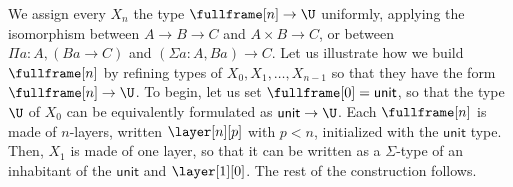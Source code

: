 \documentclass[10pt]{art.cls/art}
\newcommand{\unittype}{\ensuremath{\mathsf{unit}}}
\begin{document}
We assign every $X_n$ the type $\fullframe[n] \rightarrow \U$ uniformly, applying the isomorphism between $A \rightarrow B \rightarrow C$ and $A \times B \rightarrow C$, or between $\Pi a : A, (B a \rightarrow C)$ and $(\Sigma a : A, B a) \rightarrow C$. Let us illustrate how we build $\fullframe[n]$ by refining types of $X_0, X_1, \ldots, X_{n - 1}$ so that they have the form $\fullframe[n] \rightarrow \U$. To begin, let us set $\fullframe[0] = \unittype$, so that the type $\U$ of $X_0$ can be equivalently formulated as $\unittype \rightarrow \U$. Each $\fullframe[n]$ is made of $n$-layers, written $\layer[n][p]$ with $p < n$, initialized with the $\unittype$ type. Then, $X_1$ is made of one layer, so that it can be written as a $\Sigma$-type of an inhabitant of the $\unittype$ and $\layer[1][0]$. The rest of the construction follows.
\end{document}

